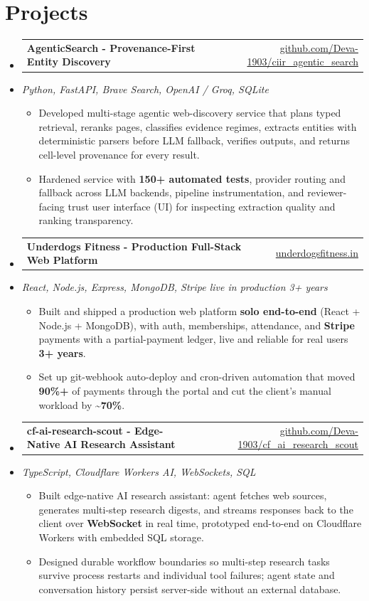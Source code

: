 \documentclass[letterpaper,10pt]{article}
\makeatletter
\newcommand{\resumeItem}[1]{
  \item\small{#1\vspace{-1pt}}
}
\newcommand{\resumeProjectHeading}[2]{
    \item
    \begin{tabular*}{0.985\textwidth}[t]{l@{\extracolsep{\fill}}r}
      \small\textbf{#1} & \small #2 \\
    \end{tabular*}\vspace{-5pt}
}
\newcommand{\resumeProjectSubheading}[1]{
  \vspace{-2pt}\item[] {\small\textcolor{ResumeSlate}{\emph{#1}}}\vspace{-3pt}
}
\newcommand{\resumeSubHeadingListStart}{\begin{itemize}[leftmargin=0.0in, label={}, itemsep=2pt, topsep=2pt]}
\newcommand{\resumeSubHeadingListEnd}{\end{itemize}}
\newcommand{\resumeItemListStart}{\begin{itemize}[leftmargin=0.18in, itemsep=2pt, topsep=1pt]}
\newcommand{\resumeItemListEnd}{\end{itemize}\vspace{-4pt}}
\makeatother
\begin{document}
\section{Projects}
\resumeSubHeadingListStart
  \resumeProjectHeading
    {AgenticSearch - Provenance-First Entity Discovery}
    {\href{https://github.com/Deva-1903/ciir_agentic_search}{github.com/Deva-1903/ciir\_agentic\_search}}
  \resumeProjectSubheading{Python, FastAPI, Brave Search, OpenAI / Groq, SQLite}
    \resumeItemListStart
      \resumeItem{Developed multi-stage agentic web-discovery service that plans typed retrieval, reranks pages, classifies evidence regimes, extracts entities with deterministic parsers before LLM fallback, verifies outputs, and returns cell-level provenance for every result.}
      \resumeItem{Hardened service with \textbf{150+ automated tests}, provider routing and fallback across LLM backends, pipeline instrumentation, and reviewer-facing trust user interface (UI) for inspecting extraction quality and ranking transparency.}
    \resumeItemListEnd
  \resumeProjectHeading
    {Underdogs Fitness - Production Full-Stack Web Platform}
    {\href{https://www.underdogsfitness.in}{underdogsfitness.in}}
  \resumeProjectSubheading{React, Node.js, Express, MongoDB, Stripe \enspace\textbar\enspace live in production 3+ years}
    \resumeItemListStart
      \resumeItem{Built and shipped a production web platform \textbf{solo end-to-end} (React + Node.js + MongoDB), with auth, memberships, attendance, and \textbf{Stripe} payments with a partial-payment ledger, live and reliable for real users \textbf{3+ years}.}
      \resumeItem{Set up git-webhook auto-deploy and cron-driven automation that moved \textbf{90\%+} of payments through the portal and cut the client's manual workload by \textbf{\textasciitilde70\%}.}
    \resumeItemListEnd
  \resumeProjectHeading
    {cf-ai-research-scout - Edge-Native AI Research Assistant}
    {\href{https://github.com/Deva-1903/cf_ai_research_scout}{github.com/Deva-1903/cf\_ai\_research\_scout}}
  \resumeProjectSubheading{TypeScript, Cloudflare Workers AI, WebSockets, SQL}
    \resumeItemListStart
      \resumeItem{Built edge-native AI research assistant: agent fetches web sources, generates multi-step research digests, and streams responses back to the client over \textbf{WebSocket} in real time, prototyped end-to-end on Cloudflare Workers with embedded SQL storage.}
      \resumeItem{Designed durable workflow boundaries so multi-step research tasks survive process restarts and individual tool failures; agent state and conversation history persist server-side without an external database.}
    \resumeItemListEnd
\resumeSubHeadingListEnd
\vspace{-4pt}
\end{document}

